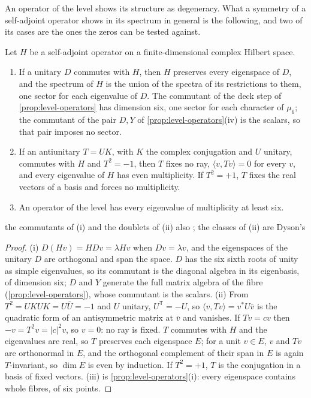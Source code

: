 An operator of the level shows its structure as degeneracy.  What a symmetry of a self-adjoint operator shows in its
spectrum in general is the following, and two of its cases are the ones the zeros can be tested against.

\begin{proposition}\label{prop:symmetry-spectrum}
Let $H$ be a self-adjoint operator on a finite-dimensional complex Hilbert space.
\begin{enumerate}[label=\textup{(\roman*)}]
  \item If a unitary $D$ commutes with $H$, then $H$ preserves every eigenspace of $D$, and the spectrum of $H$ is the
    union of the spectra of its restrictions to them, one sector for each eigenvalue of $D$.  The commutant of the deck
    step of \cref{prop:level-operators} has dimension six, one sector for each character of $\mu_6$; the commutant of
    the pair $D,Y$ of \cref{prop:level-operators}\textup{(iv)} is the scalars, so that pair imposes no sector.
  \item If an antiunitary $T=UK$, with $K$ the complex conjugation and $U$ unitary, commutes with $H$ and $T^2=-1$,
    then $T$ fixes no ray, $\langle v,Tv\rangle=0$ for every $v$, and every eigenvalue of $H$ has even multiplicity.
    If $T^2=+1$, $T$ fixes the real vectors of a basis and forces no multiplicity.
  \item An operator of the level has every eigenvalue of multiplicity at least six.
\end{enumerate}


the commutants of (i) and the doublets of
(ii) also ; the classes of (ii) are Dyson's \cite{dyson62threefold}
\end{proposition}

\begin{proof}
(i) $D(Hv)=HDv=\lambda Hv$ when $Dv=\lambda v$, and the eigenspaces of the unitary $D$ are orthogonal and span the space.
$D$ has the six sixth roots of unity as simple eigenvalues, so its commutant is the diagonal algebra in its eigenbasis,
of dimension six; $D$ and $Y$ generate the full matrix algebra of the fibre (\cref{prop:level-operators}), whose
commutant is the scalars.
(ii) From $T^2=UK UK=U\bar U=-1$ and $U$ unitary, $U^{\mathsf T}=-U$, so $\langle v,Tv\rangle=v^{*}U\bar v$ is the
quadratic form of an antisymmetric matrix at $\bar v$ and vanishes.  If $Tv=cv$ then $-v=T^2v=|c|^2v$, so $v=0$: no
ray is fixed.  $T$ commutes with $H$ and the eigenvalues are real, so $T$ preserves each eigenspace $E$; for a unit
$v\in E$, $v$ and $Tv$ are orthonormal in $E$, and the orthogonal complement of their span in $E$ is again
$T$-invariant, so $\dim E$ is even by induction.  If $T^2=+1$, $T$ is the conjugation in a basis of fixed vectors.
(iii) is \cref{prop:level-operators}\textup{(i)}: every eigenspace contains whole fibres, of six points.
\end{proof}

